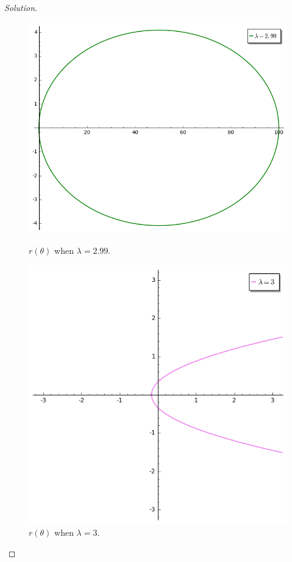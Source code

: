 \documentclass[letterpaper, 12pt]{amsart}
\theoremstyle{definition}  							%
\begin{document}
\begin{proof}[Solution]
		\begin{figure}[b]
			\centering
			\begin{minipage}[b]{.4\textwidth}
				\includegraphics[scale=0.35]{images/lambda299.png}
				\caption{$r(\theta)$ when $\lambda = 2.99$.}
				\label{lambda_299}
			\end{minipage}
			\qquad
			\begin{minipage}[b]{.4\textwidth}
				\includegraphics[scale=0.35]{images/lambda3.png}
				\caption{$r(\theta)$ when $\lambda = 3$.}
				\label{lambda_3}
			\end{minipage}
		\end{figure}


\end{proof}
\end{document}

